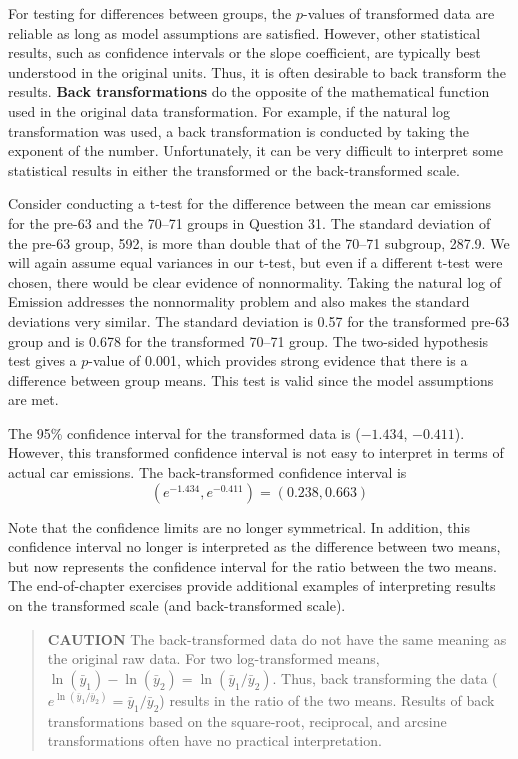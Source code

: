 \documentclass[
]{book}
\begin{document}
For testing for differences between groups, the \(p\)-values of transformed data are reliable as long as model assumptions are satisfied. However, other statistical results, such as confidence intervals or the slope coefficient, are typically best understood in the original units. Thus, it is often desirable to back transform the results. \textbf{Back transformations} do the opposite of the mathematical function used in the original data transformation. For example, if the natural log transformation was used, a back transformation is conducted by taking the exponent of the number. Unfortunately, it can be very difficult to interpret some statistical results in either the transformed or the back-transformed scale.

Consider conducting a t-test for the difference between the mean car emissions for the pre-63 and the 70--71 groups in Question 31. The standard deviation of the pre-63 group, 592, is more than double that of the 70--71 subgroup, 287.9. We will again assume equal variances in our t-test, but even if a different t-test were chosen, there would be clear evidence of nonnormality. Taking the natural log of Emission addresses the nonnormality problem and also makes the standard deviations very similar. The standard deviation is 0.57 for the transformed pre-63 group and is 0.678 for the transformed 70--71 group. The two-sided hypothesis test gives a \(p\)-value of 0.001, which provides strong evidence that there is a difference between group means. This test is valid since the model assumptions are met.

The 95\% confidence interval for the transformed data is (\(-1.434\), \(-0.411\)). However, this transformed confidence interval is not easy to interpret in terms of actual car emissions. The back-transformed confidence interval is
\[(e^{-1.434}, e^{-0.411}) = (0.238, 0.663)\]

Note that the confidence limits are no longer symmetrical. In addition, this confidence interval no longer is interpreted as the difference between two means, but now represents the confidence interval for the ratio between the two means. The end-of-chapter exercises provide additional examples of interpreting results on the transformed scale (and back-transformed scale).

\begin{quote}
\textbf{CAUTION} The back-transformed data do not have the same meaning as the original raw data. For two log-transformed means, \(\ln(\bar{y}_1) - \ln(\bar{y}_2) = \ln(\bar{y}_1/\bar{y}_2)\). Thus, back transforming the data (\(e^{\ln(\bar{y}_1/\bar{y}_2)} = \bar{y}_1/\bar{y}_2\)) results in the ratio of the two means. Results of back transformations based on the square-root, reciprocal, and arcsine transformations often have no practical interpretation.
\end{quote}
\end{document}

